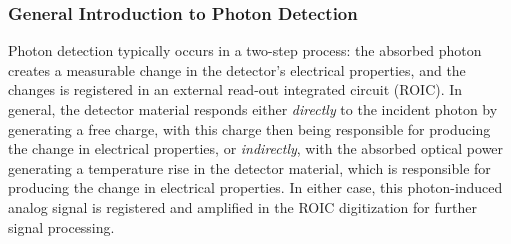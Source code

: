 \subsubsection{General Introduction to Photon Detection}
\label{introReceiver}
Photon detection typically occurs in a two-step process: the absorbed photon creates a measurable change in the detector's electrical properties, and the changes is registered in an external read-out integrated circuit (\acs{ROIC}). In general, the detector material responds either \textit{directly} to the incident photon by generating a free charge, with this charge then being responsible for producing the change in electrical properties, or \textit{indirectly}, with the absorbed optical power generating a temperature rise in the detector material, which is responsible for producing the change in electrical properties. In either case, this photon-induced analog signal is registered and amplified in the \acs{ROIC} digitization for further signal processing. 

